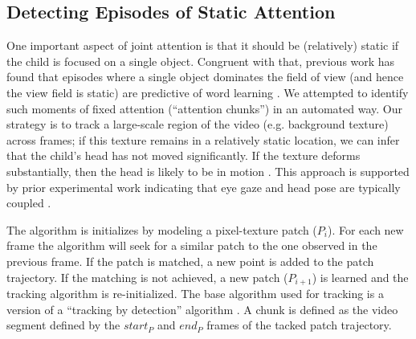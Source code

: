 \documentclass[10pt,letterpaper]{article}
\begin{document}
\subsection{Detecting Episodes of Static Attention}

One important aspect of joint attention is that it should be (relatively) static if the child is focused on a single object. Congruent with that, previous work has found that episodes where a single object dominates the field of view (and hence the view field is static) are predictive of word learning \cite{smith2011,pereira2013}. We attempted to identify such moments of fixed attention (``attention chunks'') in an automated way. Our strategy is to track a large-scale region of the video (e.g. background texture) across frames; if this texture remains in a relatively static location, we can infer that the child's head has not moved significantly. If the texture deforms substantially, then the head is likely to be in motion \cite{smith2010}. This approach is supported by prior experimental work indicating that eye gaze and head pose are typically coupled \cite{yoshida2008}. %




The algorithm is initializes by modeling a pixel-texture patch ($P_{i}$). For each new frame the algorithm will seek for a similar patch to the one observed in the previous frame. If the patch is matched, a new point is added to the patch trajectory. If the matching is not achieved, a new patch ($P_{i+1}$) is learned and the tracking algorithm is re-initialized. The base algorithm used for tracking is a version of a ``tracking by detection'' algorithm \cite{kalal2012}. A chunk is defined as the video segment defined by the $start_{P}$ and $end_{P}$ frames of the tacked patch trajectory.

\end{document}
